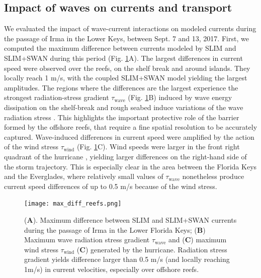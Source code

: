 \documentclass[preprint,12pt,authoryear]{elsarticle}
\begin{document}
\subsection{Impact of waves on currents and transport}

We evaluated the impact of wave-current interactions on modeled currents during the passage of Irma in the Lower Keys, between Sept. 7 and 13, 2017. First, we computed the maximum difference between currents modeled by SLIM and SLIM+SWAN during this period (Fig. \ref{fig:diff}A). The largest differences in current speed were observed over the reefs, on the shelf break and around islands. They locally reach 1 m/s, with the coupled SLIM+SWAN model yielding the largest amplitudes. The regions where the differences are the largest experience the strongest radiation-stress gradient {\boldmath$\tau$}$_\text{wave}$ (Fig. \ref{fig:diff}B) induced by wave energy dissipation on the shelf-break and rough seabed induce variations of the wave radiation stress \citep{longuet1964radiation}. This highlights the important protective role of the barrier formed by the offshore reefs, that require a fine spatial resolution to be accurately captured. Wave-induced differences in current speed were amplified by the action of the wind stress {\boldmath$\tau$}$_\text{wind}$ (Fig. \ref{fig:diff}C). Wind speeds were larger in the front right quadrant of the hurricane \citep{zedler2009ocean}, yielding larger differences on the right-hand side of the storm trajectory. This is especially clear in the area between the Florida Keys and the Everglades, where relatively small values of {\boldmath$\tau$}$_\text{wave}$ nonetheless produce current speed differences of up to 0.5 m/s because of the wind stress.

\begin{figure}
    \centering
    \texttt{[image: max\_diff\_reefs.png]}
    \caption{(\textbf{A}). Maximum difference between SLIM and SLIM+SWAN currents during the passage of Irma in the Lower Florida Keys; (\textbf{B}) Maximum wave radiation stress gradient {\boldmath$\tau$}$_\text{wave}$ and (\textbf{C}) maximum wind stress {\boldmath$\tau$}$_\text{wind}$ (\textbf{C}) generated by the hurricane. Radiation stress gradient yields difference larger than 0.5 m/s (and locally reaching 1m/s) in current velocities, especially over offshore reefs.}
    \label{fig:diff}
\end{figure}
\end{document}
